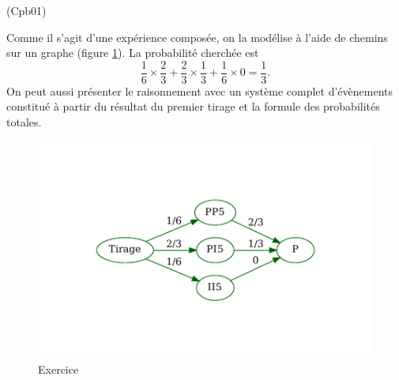 \begin{tiny}(Cpb01)\end{tiny}
Comme il s'agit d'une expérience composée, on la modélise à l'aide de chemins sur un graphe (figure \ref{fig: Cpb01_1}). La probabilité cherchée est 
\[
 \frac{1}{6}\times\frac{2}{3} + \frac{2}{3}\times\frac{1}{3} + \frac{1}{6}\times 0 = \frac{1}{3}. 
\]
On peut aussi présenter le raisonnement avec un système complet d'évènements constitué à partir du résultat du premier tirage et la formule des probabilités totales.
\begin{figure}[h]
 \centering
 \includegraphics{Cpb01_1.pdf}
 \caption{Exercice \theenumi}
 \label{fig: Cpb01_1}
\end{figure}
